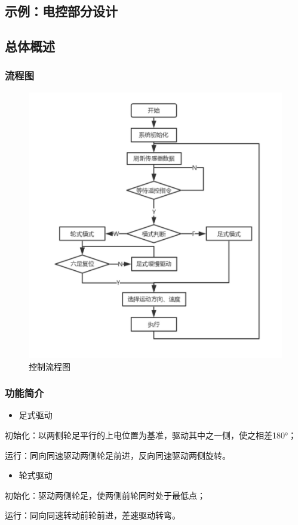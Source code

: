 \documentclass[12pt]{article}
\begin{document}
\begin{CJK}{UTF8}{gbsn}
\newpage
\section{示例：电控部分设计}
\subsection{总体概述}
\subsubsection{流程图}
 \begin{figure}[H]
\centering
\includegraphics[width=.8\textwidth]{chap5//fig1.jpg}
\caption{控制流程图}
\end{figure}
\subsubsection{功能简介}
\begin{itemize}
\item 足式驱动
\end{itemize}\par
初始化：以两侧轮足平行的上电位置为基准，驱动其中之一侧，使之相差180°；\par
运行：同向同速驱动两侧轮足前进，反向同速驱动两侧旋转。
\begin{itemize}
\item 轮式驱动
\end{itemize}\par
初始化：驱动两侧轮足，使两侧前轮同时处于最低点；\par
运行：同向同速转动前轮前进，差速驱动转弯。


\end{CJK}
\end{document}
